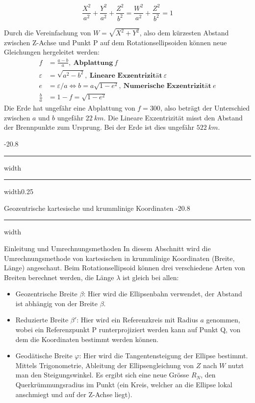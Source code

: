 \documentclass[9pt, landscape, fleqn]{scrartcl}
\makeatletter
\renewcommand{\subsection}{\@startsection{subsection}{1}{0mm}%
{-2\baselineskip}{0.8\baselineskip}%
{\hrule depth 0.2pt width\columnwidth\hrule depth0.75pt
width0.25\columnwidth\vspace*{1.2em}\large\bfseries\rmfamily}}
\renewcommand{\subsubsection}{\@startsection{subsubsection}{1}{0mm}%
{-2\baselineskip}{0.8\baselineskip}%
{\hrule depth 0.2pt width\columnwidth\vspace*{1.2em}\normalsize\bfseries\rmfamily}}
\makeatother
\begin{document}
\begin{multicols*}{3}
\begin{equation*}
    \frac{X^2}{a^2}+\frac{Y^2}{a^2} + \frac{Z^2}{b^2} = \frac{W^2}{a^2} + \frac{Z^2}{b^2}= 1
\end{equation*}

Durch die Vereinfachung von $W = \sqrt{X^2+Y^2}$, also dem kürzesten Abstand zwischen Z-Achse und Punkt P auf dem Rotationsellipsoiden können neue Gleichungen hergeleitet werden:
\begin{align*}
    f &= \frac{a-b}{a},~ \textbf{Abplattung}~f \\
    \varepsilon &= \sqrt{a^2-b^2},~\textbf{Lineare Exzentrizität}~\varepsilon \\
    e &= \varepsilon/a \Longleftrightarrow b=a \sqrt{1-e^2},~\textbf{Numerische Exzentrizität}~e \\
    \frac{b}{a}&=1-f = \sqrt{1-e^2}
\end{align*}
Die Erde hat ungefähr eine Abplattung von $f=300$, also beträgt der Unterschied zwischen $a$ und $b$ ungefähr $22~km$. Die Lineare Exzentrizität misst den Abstand der Brennpunkte zum Ursprung. Bei der Erde ist dies ungefähr $522~km$. 

\subsection{Geozentrische kartesische und krummlinige Koordinaten}
\subsubsection{Einleitung und Umrechnungsmethoden}
In diesem Abschnitt wird die Umrechnungsmethode von kartesischen in krummlinige Koordinaten (Breite, Länge) angeschaut. Beim Rotationsellipsoid können drei verschiedene Arten von Breiten berechnet werden, die Länge $\lambda$ ist gleich bei allen:
\begin{itemize}
    \item Geozentrische Breite $\beta$: Hier wird die Ellipsenbahn verwendet, der Abstand ist abhängig von der Breite $\beta$.
    \item Reduzierte Breite $\beta'$: Hier wird ein Referenzkreis mit Radius $a$ genommen, wobei ein Referenzpunkt P runterprojiziert werden kann auf Punkt Q, von dem die Koordinaten bestimmt werden können.
    \item Geodätische Breite $\varphi$: Hier wird die Tangentensteigung der Ellipse bestimmt. Mittels Trigonometrie, Ableitung der Ellipsengleichung von $Z$ nach $W$ nutzt man den Steigungswinkel. Es ergibt sich eine neue Grösse $R_N$, den Querkrümmungsradius im Punkt (ein Kreis, welcher an die Ellipse lokal anschmiegt und auf der Z-Achse liegt).
\end{itemize}


\end{multicols*}
\end{document}
